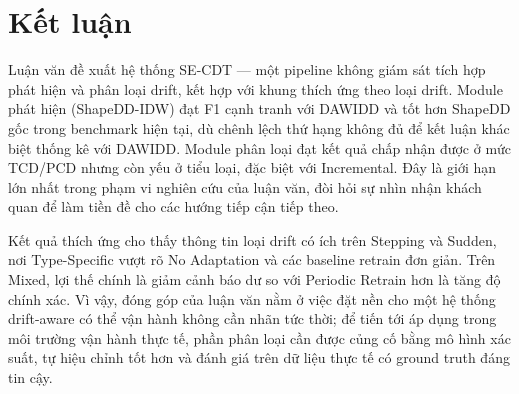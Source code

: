 \section{Kết luận}

Luận văn đề xuất hệ thống SE-CDT --- một pipeline không giám sát tích hợp phát hiện và phân loại drift, kết hợp với khung thích ứng theo loại drift. Module phát hiện (ShapeDD-IDW) đạt F1 cạnh tranh với DAWIDD và tốt hơn ShapeDD gốc trong benchmark hiện tại, dù chênh lệch thứ hạng không đủ để kết luận khác biệt thống kê với DAWIDD. Module phân loại đạt kết quả chấp nhận được ở mức TCD/PCD nhưng còn yếu ở tiểu loại, đặc biệt với Incremental. Đây là giới hạn lớn nhất trong phạm vi nghiên cứu của luận văn, đòi hỏi sự nhìn nhận khách quan để làm tiền đề cho các hướng tiếp cận tiếp theo.

Kết quả thích ứng cho thấy thông tin loại drift có ích trên Stepping và Sudden, nơi Type-Specific vượt rõ No Adaptation và các baseline retrain đơn giản. Trên Mixed, lợi thế chính là giảm cảnh báo dư so với Periodic Retrain hơn là tăng độ chính xác. Vì vậy, đóng góp của luận văn nằm ở việc đặt nền cho một hệ thống drift-aware có thể vận hành không cần nhãn tức thời; để tiến tới áp dụng trong môi trường vận hành thực tế, phần phân loại cần được củng cố bằng mô hình xác suất, tự hiệu chỉnh tốt hơn và đánh giá trên dữ liệu thực tế có ground truth đáng tin cậy.
